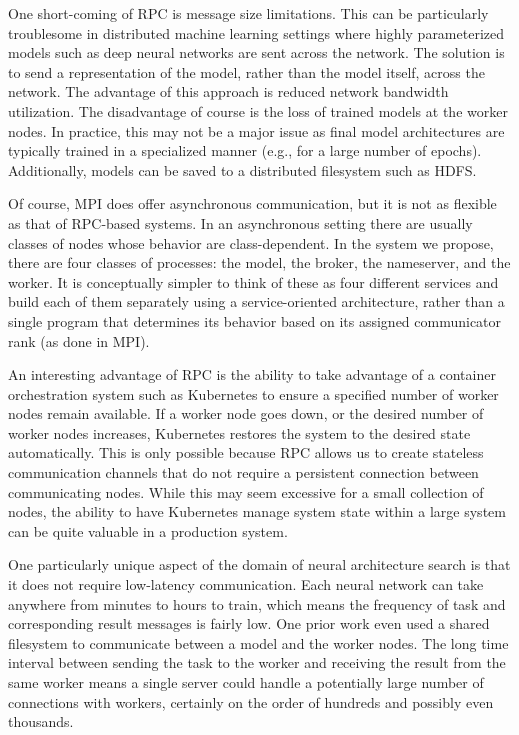 \documentclass[conference]{IEEEtran}
\begin{document}
One short-coming of RPC is message size limitations. This can be particularly
troublesome in distributed machine learning settings where highly parameterized
models such as deep neural networks are sent across the network. The solution
is to send a representation of the model, rather than the model itself, across
the network. The advantage of this approach is reduced network bandwidth
utilization. The disadvantage of course is the loss of trained models at the
worker nodes. In practice, this may not be a major issue as final model
architectures are typically trained in a specialized manner (e.g., for a large
number of epochs). Additionally, models can be saved to a distributed filesystem
such as HDFS.

Of course, MPI does offer asynchronous communication, but it is not as flexible
as that of RPC-based systems. In an asynchronous setting there are usually
classes of nodes whose behavior are class-dependent. In the system we propose,
there are four classes of processes: the model, the broker, the nameserver, and
the worker. It is conceptually simpler to think of these as four different
services and build each of them separately using a service-oriented
architecture, rather than a single program that determines its behavior based on
its assigned communicator rank (as done in MPI).

An interesting advantage of RPC is the ability to take advantage of a container
orchestration system such as Kubernetes \cite{43826} to ensure a specified
number of worker nodes remain available. If a worker node goes down, or the
desired number of worker nodes increases, Kubernetes restores the system to
the desired state automatically. This is only possible because RPC allows us to
create stateless communication channels that do not require a persistent connection
between communicating nodes. While this may seem excessive for a small collection
of nodes, the ability to have Kubernetes manage system state within a large
system can be quite valuable in a production system.

One particularly unique aspect of the domain of neural architecture search is
that it does not require low-latency communication. Each neural network can take
anywhere from minutes to hours to train, which means the frequency of
task and corresponding result messages is fairly low. One prior work
\cite{DBLP:conf/icml/RealMSSSTLK17} even used a shared filesystem to communicate
between a model and the worker nodes. The long time interval between sending the
task to the worker and receiving the result from the same worker means a single
server could handle a potentially large number of connections with workers,
certainly on the order of hundreds and possibly even thousands.
\end{document}
